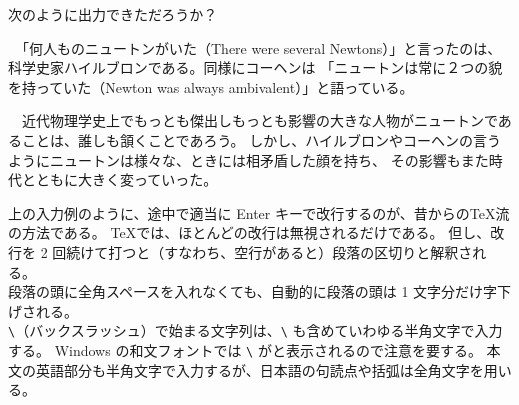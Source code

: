 次のように出力できただろうか？
\begin{mdframed}[roundcorner=0.50zw,leftmargin=3.00zw,rightmargin=3.00zw,skipabove=0.40zw,skipbelow=0.40zw,innertopmargin=4.00pt,innerbottommargin=4.00pt,innerleftmargin=5.00pt,innerrightmargin=5.00pt,linecolor=gray!100,linewidth=0.50pt,backgroundcolor=gray!00]
　「何人ものニュートンがいた（There were several Newtons）」と言ったのは、科学史家ハイルブロンである。同様にコーヘンは
「ニュートンは常に２つの貌を持っていた（Newton was always ambivalent）」と語っている。

　近代物理学史上でもっとも傑出しもっとも影響の大きな人物がニュートンであることは、誰しも頷くことであろう。
しかし、ハイルブロンやコーヘンの言うようにニュートンは様々な、ときには相矛盾した顔を持ち、
その影響もまた時代とともに大きく変っていった。
\end{mdframed}
上の入力例のように、途中で適当に Enter キーで改行するのが、昔からの\TeX{}流の方法である。
\TeX{}では、ほとんどの改行は無視されるだけである。
但し、改行を 2 回続けて打つと（すなわち、空行があると）段落の区切りと解釈される。\\

段落の頭に全角スペースを入れなくても、自動的に段落の頭は 1 文字分だけ字下げされる。\\

\verb'\'（バックスラッシュ）で始まる文字列は、\verb'\' も含めていわゆる半角文字で入力する。
Windows の和文フォントでは \verb'\' が\textyen{}と表示されるので注意を要する。
本文の英語部分も半角文字で入力するが、日本語の句読点や括弧は全角文字を用いる。\\

